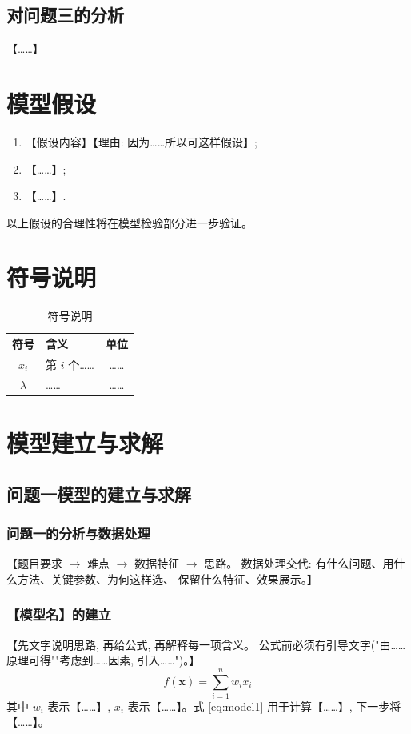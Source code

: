 \documentclass[11pt]{ctexart}
\begin{document}
\subsection{对问题三的分析}
【……】

\section{模型假设}
\begin{enumerate}
  \item 【假设内容】【理由: 因为……所以可这样假设】;
  \item 【……】;
  \item 【……】.
\end{enumerate}
以上假设的合理性将在模型检验部分进一步验证。

\section{符号说明}
\begin{table}[H]
  \centering
  \begin{tabular}{clc}
    \toprule
    符号 & 含义 & 单位 \\
    \midrule
    $x_i$ & 第 $i$ 个…… & …… \\
    $\lambda$ & …… & …… \\
    \bottomrule
  \end{tabular}
  \caption{符号说明}
\end{table}

\section{模型建立与求解}

\subsection{问题一模型的建立与求解}

\subsubsection{问题一的分析与数据处理}
【题目要求 $\rightarrow$ 难点 $\rightarrow$ 数据特征 $\rightarrow$ 思路。
数据处理交代: 有什么问题、用什么方法、关键参数、为何这样选、
保留什么特征、效果展示。】

\subsubsection{【模型名】的建立}
【先文字说明思路, 再给公式, 再解释每一项含义。
公式前必须有引导文字("由……原理可得""考虑到……因素, 引入……")。】
\begin{equation}
  f(\mathbf{x}) = \sum_{i=1}^{n} w_i x_i \label{eq:model1}
\end{equation}
其中 $w_i$ 表示【……】, $x_i$ 表示【……】。式 \eqref{eq:model1} 用于计算【……】, 下一步将【……】。
\end{document}
